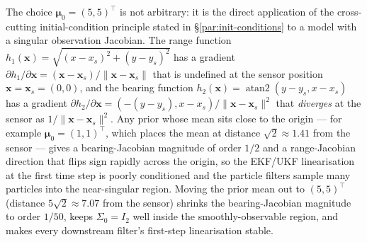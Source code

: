 \documentclass{article}
\begin{document}
The choice $\boldsymbol{\mu}_0 = (5, 5)^\top$ is not arbitrary: it is the direct application of the cross-cutting initial-condition principle stated in \S\ref{par:init-conditions} to a model with a singular observation Jacobian. The range function $h_1(\mathbf{x}) = \sqrt{(x - x_s)^2 + (y - y_s)^2}$ has a gradient $\partial h_1/\partial \mathbf{x} = (\mathbf{x} - \mathbf{x}_s)/\lVert \mathbf{x} - \mathbf{x}_s\rVert$ that is undefined at the sensor position $\mathbf{x} = \mathbf{x}_s = (0,0)$, and the bearing function $h_2(\mathbf{x}) = \operatorname{atan2}(y - y_s, x - x_s)$ has a gradient $\partial h_2/\partial \mathbf{x} = (-(y-y_s), x-x_s)/\lVert \mathbf{x} - \mathbf{x}_s\rVert^2$ that \emph{diverges} at the sensor as $1/\lVert \mathbf{x} - \mathbf{x}_s\rVert^2$. Any prior whose mean sits close to the origin --- for example $\boldsymbol{\mu}_0 = (1, 1)^\top$, which places the mean at distance $\sqrt{2} \approx 1.41$ from the sensor --- gives a bearing-Jacobian magnitude of order $1/2$ and a range-Jacobian direction that flips sign rapidly across the origin, so the EKF/UKF linearisation at the first time step is poorly conditioned and the particle filters sample many particles into the near-singular region. Moving the prior mean out to $(5, 5)^\top$ (distance $5\sqrt{2} \approx 7.07$ from the sensor) shrinks the bearing-Jacobian magnitude to order $1/50$, keeps $\Sigma_0 = I_2$ well inside the smoothly-observable region, and makes every downstream filter's first-step linearisation stable. 
\end{document}
